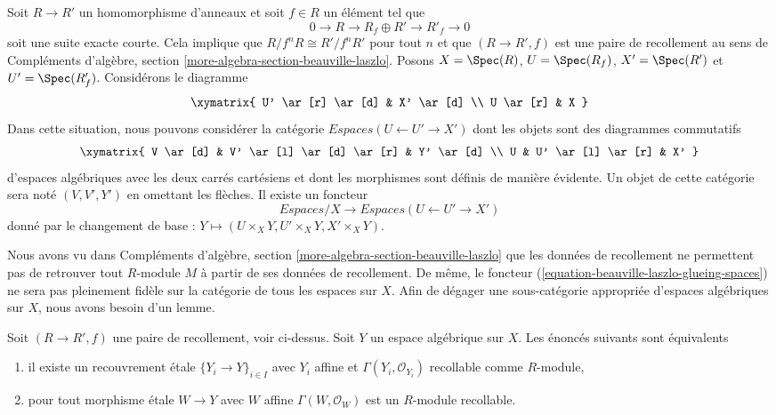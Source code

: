 \noindent
Soit $R \to R'$ un homomorphisme d'anneaux et soit $f \in R$ un élément tel que
$$
0 \to R \to R_f \oplus R' \to R'_f \to 0
$$
soit une suite exacte courte. Cela implique que $R/f^nR \cong R'/f^nR'$
pour tout $n$ et que $(R \to R', f)$ est une paire de recollement au sens de
Compléments d'algèbre, section \ref{more-algebra-section-beauville-laszlo}.
Posons $X = \Spec(R)$, $U = \Spec(R_f)$, $X' = \Spec(R')$ et
$U' = \Spec(R'_f)$. Considérons le diagramme
$$
\xymatrix{
U' \ar[r] \ar[d] & X' \ar[d] \\
U \ar[r] & X
}
$$
Dans cette situation, nous pouvons considérer la catégorie
$\textit{Espaces}(U \leftarrow U' \to X')$ dont les objets
sont des diagrammes commutatifs
$$
\xymatrix{
V \ar[d] & V' \ar[l] \ar[d] \ar[r] & Y' \ar[d] \\
U & U' \ar[l] \ar[r] & X'
}
$$
d'espaces algébriques avec les deux carrés cartésiens et dont les morphismes
sont définis de manière évidente. Un objet de cette catégorie sera
noté $(V, V', Y')$ en omettant les flèches.
Il existe un foncteur
\begin{equation}
\label{equation-beauville-laszlo-glueing-spaces}
\textit{Espaces}/X
\longrightarrow
\textit{Espaces}(U \leftarrow U' \to X')
\end{equation}
donné par le changement de base : $Y \mapsto (U \times_X Y, U' \times_X Y, X' \times_X Y)$.

\medskip\noindent
Nous avons vu dans
Compléments d'algèbre, section \ref{more-algebra-section-beauville-laszlo}
que les données de recollement ne permettent pas de retrouver tout $R$-module $M$ à partir de ses
données de recollement. De même, le foncteur
(\ref{equation-beauville-laszlo-glueing-spaces})
ne sera pas pleinement fidèle sur la catégorie de tous les espaces sur $X$.
Afin de dégager une sous-catégorie appropriée d'espaces algébriques sur $X$, nous avons besoin d'un lemme.

\begin{lemma}
\label{lemma-glueable}
Soit $(R \to R', f)$ une paire de recollement, voir ci-dessus. Soit $Y$ un espace algébrique sur $X$. Les énoncés suivants sont équivalents
\begin{enumerate}
\item il existe un recouvrement \'etale $\{Y_i \to Y\}_{i \in I}$
avec $Y_i$ affine et $\Gamma(Y_i, \mathcal{O}_{Y_i})$
recollable comme $R$-module,
\item pour tout morphisme \'etale $W \to Y$ avec $W$ affine
$\Gamma(W, \mathcal{O}_W)$ est un $R$-module recollable.
\end{enumerate}
\end{lemma}

